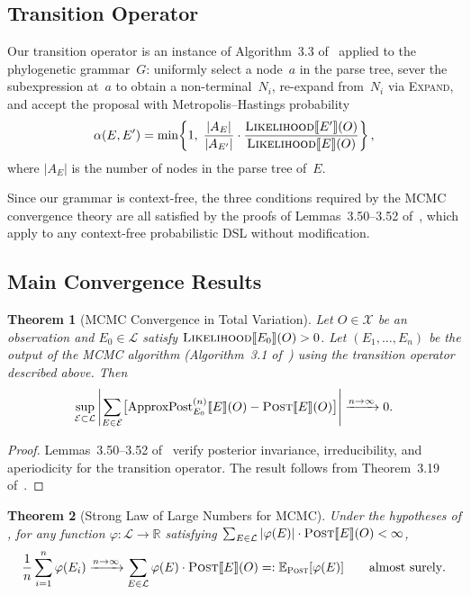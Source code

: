 \documentclass[11pt,a4paper]{article}
\newtheorem{theorem}[theorem]{Theorem}
\newcommand{\LL}{\mathcal{L}}
\newcommand{\XX}{\mathcal{X}}
\newcommand{\Likelihood}{\textsc{Likelihood}}
\newcommand{\Post}{\textsc{Post}}
\newcommand{\Expand}{\textsc{Expand}}
\newcommand{\sem}[1]{\llbracket #1 \rrbracket}
\begin{document}
\subsection{Transition Operator}

Our transition operator is an instance of Algorithm~3.3
of~\cite{saad2023} applied to the phylogenetic grammar~$G$: uniformly
select a node~$a$ in the parse tree, sever the subexpression at~$a$ to
obtain a non-terminal~$N_i$, re-expand from~$N_i$ via \Expand, and
accept the proposal with Metropolis--Hastings probability
\begin{equation}
  \alpha(E, E') = \min\!\left\{
    1,\;
    \frac{|A_E|}{|A_{E'}|}
    \cdot
    \frac{\Likelihood\sem{E'}(O)}{\Likelihood\sem{E}(O)}
  \right\},
  \label{eq:mh-accept}
\end{equation}
where $|A_E|$ is the number of nodes in the parse tree of~$E$.

Since our grammar is context-free, the three conditions required by the
MCMC convergence theory are all satisfied by the proofs of
Lemmas~3.50--3.52 of~\cite{saad2023}, which apply to any
context-free probabilistic DSL without modification.

\subsection{Main Convergence Results}

\begin{theorem}[MCMC Convergence in Total Variation]\label{thm:mcmc-tv}
Let $O \in \XX$ be an observation and $E_0 \in \LL$ satisfy
$\Likelihood\sem{E_0}(O) > 0$.  Let $(E_1, \ldots, E_n)$ be the
output of the MCMC algorithm (Algorithm~3.1 of~\cite{saad2023}) using
the transition operator described above.  Then
\begin{equation}
  \sup_{\mathcal{E} \subset \LL}
  \left|
    \sum_{E \in \mathcal{E}}
    \bigl[\mathrm{ApproxPost}^{(n)}_{E_0}\sem{E}(O)
    - \Post\sem{E}(O)\bigr]
  \right|
  \xrightarrow{n \to \infty} 0.
\end{equation}
\end{theorem}

\begin{proof}
Lemmas~3.50--3.52 of~\cite{saad2023} verify posterior invariance,
irreducibility, and aperiodicity for the transition operator.  The
result follows from Theorem~3.19 of~\cite{saad2023}.
\end{proof}

\begin{theorem}[Strong Law of Large Numbers for MCMC]\label{thm:mcmc-lln}
Under the hypotheses of , for any function
$\varphi : \LL \to \mathbb{R}$ satisfying
$\sum_{E \in \LL} |\varphi(E)| \cdot \Post\sem{E}(O) < \infty$,
\begin{equation}
  \frac{1}{n} \sum_{i=1}^{n} \varphi(E_i)
  \xrightarrow{n \to \infty}
  \sum_{E \in \LL} \varphi(E) \cdot \Post\sem{E}(O)
  =: \mathbb{E}_{\Post}[\varphi(E)]
  \qquad \text{almost surely}.
\end{equation}
\end{theorem}
\end{document}
